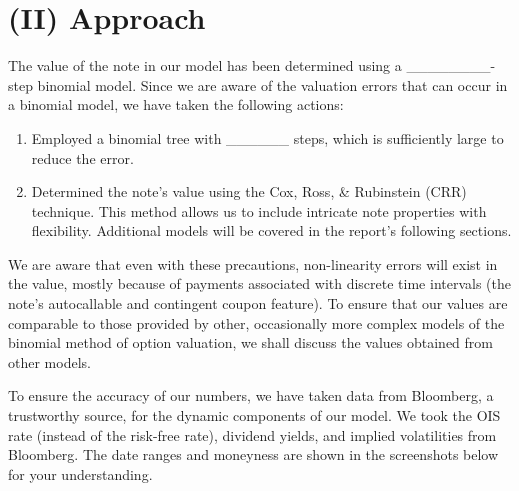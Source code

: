 \documentclass[12pt,a4paper]{article}
\begin{document}
\section*{(II) Approach}

The value of the note in our model has been determined using a \_\_\_\_\_\_\_\_-step binomial model. Since we are aware of the valuation errors that can occur in a binomial model, we have taken the following actions:
\begin{enumerate}
    \item Employed a binomial tree with \_\_\_\_\_\_ steps, which is sufficiently large to reduce the error.
    \item Determined the note's value using the Cox, Ross, \& Rubinstein (CRR) technique. This method allows us to include intricate note properties with flexibility. Additional models will be covered in the report's following sections.
\end{enumerate}

We are aware that even with these precautions, non-linearity errors will exist in the value, mostly because of payments associated with discrete time intervals (the note's autocallable and contingent coupon feature). To ensure that our values are comparable to those provided by other, occasionally more complex models of the binomial method of option valuation, we shall discuss the values obtained from other models.

To ensure the accuracy of our numbers, we have taken data from Bloomberg, a trustworthy source, for the dynamic components of our model. We took the OIS rate (instead of the risk-free rate), dividend yields, and implied volatilities from Bloomberg. The date ranges and moneyness are shown in the screenshots below for your understanding.
\end{document}
